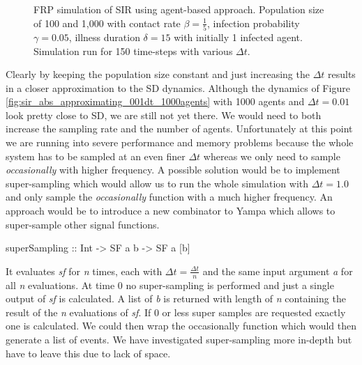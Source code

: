\begin{figure}
\begin{center}
	\caption{FRP simulation of SIR using agent-based approach. Population size of 100 and 1,000 with contact rate $\beta = \frac{1}{5}$, infection probability $\gamma = 0.05$, illness duration $\delta = 15$ with initially 1 infected agent. Simulation run for 150 time-steps with various $\Delta t$.} 
	\label{fig:sir_abs_dynamics_frp}
\end{center}
\end{figure}

Clearly by keeping the population size constant and just increasing the $\Delta t$ results in a closer approximation to the SD dynamics. Although the dynamics of Figure \ref{fig:sir_abs_approximating_001dt_1000agents} with 1000 agents and $\Delta t = 0.01$ look pretty close to SD, we are still not yet there. We would need to both increase the sampling rate and the number of agents. Unfortunately at this point we are running into severe performance and memory problems because the whole system has to be sampled at an even finer $\Delta t$ whereas we only need to sample \textit{occasionally} with higher frequency. A possible solution would be to implement super-sampling which would allow us to run the whole simulation with $\Delta t = 1.0$ and only sample the \textit{occasionally} function with a much higher frequency. An approach would be to introduce a new combinator to Yampa which allows to super-sample other signal functions. 

\begin{HaskellCode}
superSampling :: Int -> SF a b -> SF a [b]
\end{HaskellCode}

It evaluates \textit{sf} for \textit{n} times, each with $\Delta t = \frac{\Delta t}{n}$ and the same input argument \textit{a} for all \textit{n} evaluations. At time 0 no super-sampling is performed and just a single output of \textit{sf} is calculated. A list of \textit{b} is returned with length of \textit{n} containing the result of the \textit{n} evaluations of \textit{sf}. If 0 or less super samples are requested exactly one is calculated. We could then wrap the occasionally function which would then generate a list of events. We have investigated super-sampling more in-depth but have to leave this due to lack of space.

